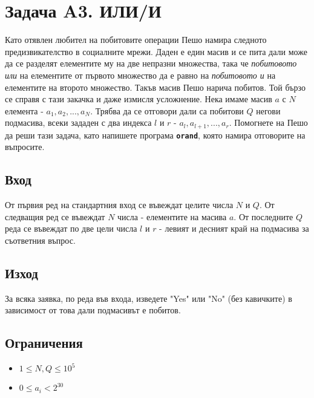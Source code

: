 \documentclass[12pt]{article}
\begin{document}
\section{Задача A3. ИЛИ/И}

Като отявлен любител на побитовите операции Пешо намира следното предизвикателство в социалните мрежи. Даден е един масив и се пита дали може да се разделят елементите му на две непразни множества, така че \textit{побитовото или} на елементите от първото множество да е равно на \textit{побитовото и} на елементите на второто множество. Такъв масив Пешо нарича побитов. Той бързо се справя с тази закачка и даже измисля усложнение. Нека имаме масив $a$ с $N$ елемента - $a_1, a_2, ..., a_N$. Трябва да се отговори дали са побитови $Q$ негови подмасива, всеки зададен с два индекса $l$ и $r$ - $a_l, a_{l+1}, ..., a_r$. Помогнете на Пешо да реши тази задача, като напишете програма \textbf{\texttt{orand}}, която намира отговорите на въпросите.

\subsection{Вход}

От първия ред на стандартния вход се въвеждат целите числа $N$ и $Q$. От следващия ред се въвеждат $N$ числа - елементите на масива $a$. От последните $Q$ реда се въвеждат по две цели числа $l$ и $r$ - левият и десният край на подмасива за съответния въпрос.

\subsection{Изход}
За всяка заявка, по реда във входа, изведете "Yes" или "No" (без кавичките) в зависимост от това дали подмасивът е побитов.

\subsection{Ограничения}
\begin{itemize}
	\item $1\leq N, Q\leq 10^5$
	\item $0\leq a_i < 2^{30}$
\end{itemize}
\end{document}
